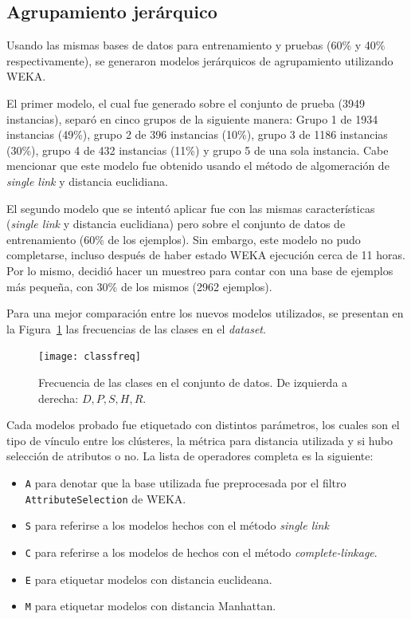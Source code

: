 \documentclass{llncs}
\begin{document}
\subsection{Agrupamiento jerárquico}
\label{subsec:cluster}

Usando las mismas bases de datos para entrenamiento y pruebas (60\% y 40\% respectivamente),
se generaron modelos jerárquicos de agrupamiento utilizando WEKA.

El primer modelo, el cual fue generado sobre el conjunto de prueba (3949 instancias), separó en cinco grupos de la siguiente manera:
Grupo 1 de 1934 instancias (49\%), grupo 2 de 396 instancias (10\%),
grupo 3 de 1186 instancias (30\%), grupo 4 de 432 instancias (11\%)
y grupo 5 de una sola instancia.
Cabe mencionar que este modelo fue obtenido usando el método de algomeración de \textit{single link} y distancia euclidiana.

El segundo modelo que se intentó aplicar fue con las mismas características (\textit{single link} y distancia euclidiana)
pero sobre el conjunto de datos de entrenamiento (60\% de los ejemplos).
Sin embargo, este modelo no pudo completarse, incluso después de haber estado WEKA ejecución cerca de 11 horas.
Por lo mismo, decidió hacer un muestreo para contar con una base de ejemplos más pequeña, con 30\% de los mismos (2962 ejemplos).

Para una mejor comparación entre los nuevos modelos utilizados,
se presentan en la Figura~\ref{fig:classfreq} las frecuencias de las clases en el \textit{dataset}.

\begin{figure}[htbp]
	\centering
	\texttt{[image: classfreq]}
	\caption{Frecuencia de las clases en el conjunto de datos.
	De izquierda a derecha: $D, P, S, H, R$.}
	\label{fig:classfreq}
\end{figure}

Cada modelos probado fue etiquetado con distintos parámetros, los cuales son el tipo de vínculo entre los clústeres,
la métrica para distancia utilizada y si hubo selección de atributos o no.
La lista de operadores completa es la siguiente:

\begin{itemize}
	\item \texttt{A} para denotar que la base utilizada fue preprocesada por el filtro \texttt{AttributeSelection} de WEKA.
	\item \texttt{S} para referirse a los modelos hechos con el método \textit{single link}
	\item \texttt{C} para referirse a los modelos de hechos con el método \textit{complete-linkage}.
	\item \texttt{E} para etiquetar modelos con distancia euclideana.
	\item \texttt{M} para etiquetar modelos con distancia Manhattan.
\end{itemize}
\end{document}

